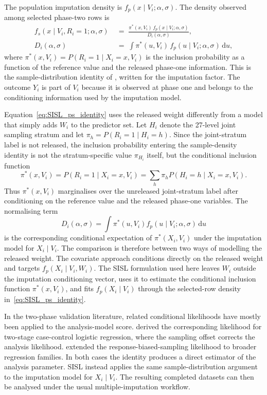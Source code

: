 The population imputation density is $f_p(x\mid V_i;\alpha,\sigma)$. The density observed among selected phase-two rows is
\begin{equation}
\begin{aligned}
f_s(x\mid V_i,R_i=1;\alpha,\sigma)
&\;=\;
\frac{\pi^*(x,V_i)\, f_p(x\mid V_i;\alpha,\sigma)}
{D_i(\alpha,\sigma)}, \\
D_i(\alpha,\sigma)
&\;=\;
\int \pi^*(u,V_i)\, f_p(u\mid V_i;\alpha,\sigma)\,\mathrm{d}u,
\end{aligned}
\label{eq:SISL_ps_identity}
\end{equation}
where $\pi^*(x,V_i)=P(R_i=1\mid X_i=x,V_i)$ is the inclusion probability as a function of the reference value and the released phase-one information. This is the sample-distribution identity of \citet{pfeffermann1999parametric}, written for the imputation factor. The outcome $Y_i$ is part of $V_i$ because it is observed at phase one and belongs to the conditioning information used by the imputation model.

Equation~\eqref{eq:SISL_ps_identity} uses the released weight differently from a model that simply adds $W_i$ to the predictor set. Let $H_i$ denote the 27-level joint sampling stratum and let $\pi_h=P(R_i=1\mid H_i=h)$. Since the joint-stratum label is not released, the inclusion probability entering the sample-density identity is not the stratum-specific value $\pi_{H_i}$ itself, but the conditional inclusion function
\[
\pi^*(x,V_i)=P(R_i=1\mid X_i=x,V_i)
=\sum_h \pi_h P(H_i=h\mid X_i=x,V_i).
\]
Thus $\pi^*(x,V_i)$ marginalises over the unreleased joint-stratum label after conditioning on the reference value and the released phase-one variables. The normalising term
\[
D_i(\alpha,\sigma)
=
\int \pi^*(u,V_i) f_p(u\mid V_i;\alpha,\sigma)\,\mathrm{d}u
\]
is the corresponding conditional expectation of $\pi^*(X_i,V_i)$ under the imputation model for $X_i\mid V_i$. The comparison is therefore between two ways of modelling the released weight. The covariate approach conditions directly on the released weight and targets $f_p(X_i\mid V_i,W_i)$. The SISL formulation used here leaves $W_i$ outside the imputation conditioning vector, uses it to estimate the conditional inclusion function $\pi^*(x,V_i)$, and fits $f_p(X_i\mid V_i)$ through the selected-row density in~\eqref{eq:SISL_ps_identity}.

In the two-phase validation literature, related conditional likelihoods have mostly been applied to the analysis-model score. \citet{breslow1988logistic} derived the corresponding likelihood for two-stage case-control logistic regression, where the sampling offset corrects the analysis likelihood. \citet{scott2011fitting} extended the response-biased-sampling likelihood to broader regression families. In both cases the identity produces a direct estimator of the analysis parameter. SISL instead applies the same sample-distribution argument to the imputation model for $X_i\mid V_i$. The resulting completed datasets can then be analysed under the usual multiple-imputation workflow.
 

